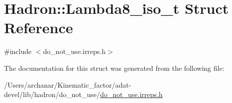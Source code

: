 \hypertarget{structHadron_1_1Lambda8__iso__t}{}\section{Hadron\+:\+:Lambda8\+\_\+iso\+\_\+t Struct Reference}
\label{structHadron_1_1Lambda8__iso__t}


{\ttfamily \#include $<$do\+\_\+not\+\_\+use.\+irreps.\+h$>$}



The documentation for this struct was generated from the following file\+:\begin{DoxyCompactItemize}
\item 
/\+Users/archanar/\+Kinematic\+\_\+factor/adat-\/devel/lib/hadron/do\+\_\+not\+\_\+use/\mbox{\hyperlink{adat-devel_2lib_2hadron_2do__not__use_2do__not__use_8irreps_8h}{do\+\_\+not\+\_\+use.\+irreps.\+h}}\end{DoxyCompactItemize}
